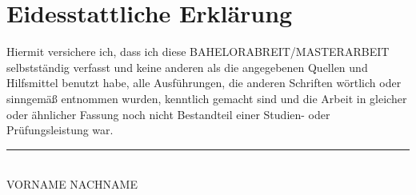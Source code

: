 \chapter*{Eidesstattliche Erklärung}
\label{sec:affidavit}
Hiermit versichere ich, dass ich diese BAHELORABREIT/MASTERARBEIT selbstständig
verfasst und keine anderen als die angegebenen Quellen und Hilfsmittel
benutzt habe, alle Ausführungen, die anderen Schriften wörtlich oder
sinngemäß entnommen wurden, kenntlich gemacht sind und die Arbeit in
gleicher oder ähnlicher Fassung noch nicht Bestandteil einer Studien-
oder Prüfungsleistung war.

\vspace{20mm}

\noindent
\rule[-0.2cm]{5cm}{0.5pt}\\
VORNAME NACHNAME
